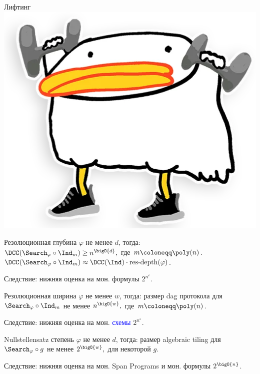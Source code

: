 \begin{frame}{Лифтинг \includegraphics[scale = 0.04]{pics/utia-lift.png}}

    \begin{theorem}
        Резолюционная глубина $\varphi$ не менее $d$, тогда:
        $\DCC(\Search_{\varphi} \circ \Ind_m) \ge n^{\bigO{d}},$
        где $m \coloneqq \poly(n)$. \alert{$\DCC(\Search_{\varphi} \circ \Ind_m) \approx
            \DCC(\Ind) \cdot \mathrm{res\text{-}depth}(\varphi)$.}
    \end{theorem}

    Следствие: нижняя оценка на мон. формулы $2^{n^{\varepsilon}}$.
    \pause

    \begin{theorem}
        Резолюционная ширина $\varphi$ не менее $w$, тогда:
        размер dag протокола для $\Search_{\varphi} \circ \Ind_m$ не менее $n^{\bigO{w}},$
        где $m \coloneqq \poly(n)$.
    \end{theorem}

    Следствие: нижняя оценка на мон. \textcolor{blue}{схемы} $2^{n^{\varepsilon}}$.
    \pause

    \begin{theorem}
        Nullstellensatz степень $\varphi$ не менее $d$, тогда:
        размер \alert{algebraic tiling} для $\Search_{\varphi} \circ g$ не менее $2^{\bigO{w}},$
        для некоторой $g$.
    \end{theorem}

    Следствие: нижняя оценка на мон. Span Programs и мон. формулы $2^{\bigO{n}}$.

\end{frame}